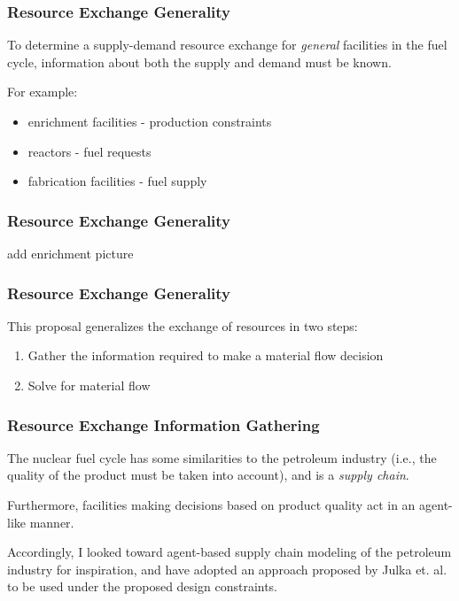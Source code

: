 
\begin{frame}[ctb!]
  \frametitle{Resource Exchange Generality}

  To determine a supply-demand resource exchange for \textit{general} facilities
  in the fuel cycle, information about both the supply and demand must be known.

  \vspace{0.2cm}
  
  For example:
  \begin{itemize}
    \item enrichment facilities - production constraints
    \item reactors - fuel requests
    \item fabrication facilities - fuel supply
  \end{itemize}
  
\end{frame}

\begin{frame}[ctb!]
  \frametitle{Resource Exchange Generality}

  add enrichment picture
  
\end{frame}

\begin{frame}[ctb!]
  \frametitle{Resource Exchange Generality}

  This proposal generalizes the exchange of resources in two steps:

  \begin{enumerate}
    \item Gather the information required to make a material flow decision
    \item Solve for material flow
  \end{enumerate}
\end{frame}

\begin{frame}[ctb!]
  \frametitle{Resource Exchange Information Gathering}

  The nuclear fuel cycle has some similarities to the petroleum industry (i.e.,
  the quality of the product must be taken into account), and is a
  \textit{supply chain}.\vspace{0.2cm}

  Furthermore, facilities making decisions based on product quality act in an
  agent-like manner.\vspace{0.2cm} 

  Accordingly, I looked toward agent-based supply chain modeling of the
  petroleum industry for inspiration, and have adopted an approach proposed by
  Julka et. al. \cite{julka_agent-based_2002} to be used under the proposed
  \Cyclus design constraints.
\end{frame}

